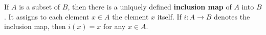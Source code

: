 If $A$ is a subset of $B$, then there is a uniquely defined \textbf{inclusion map} of $A$ into $B$. It assigns to each element $x \in A$ the element $x$ itself. If $i : A \to B$ denotes the inclusion map, then $i(x) = x$ for any $x \in A$.

